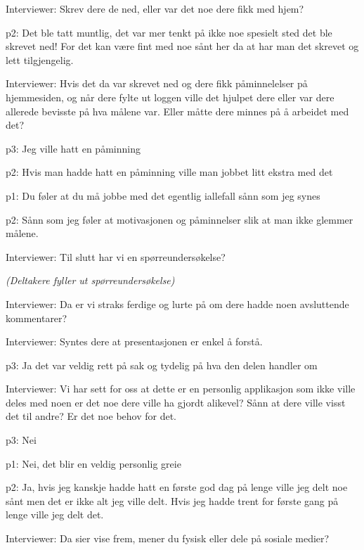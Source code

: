 \documentclass[11pt, norsk, a4paper]{article}
\begin{document}
\textcolor{myBlue} {Interviewer: }Skrev dere de ned, eller var det noe dere fikk med hjem?


\textcolor{myYellow} {p2: }Det ble tatt muntlig, det var mer tenkt på ikke noe spesielt sted det ble skrevet ned! For det kan være fint med noe sånt her da at har man det skrevet og lett tilgjengelig.


\textcolor{myBlue} {Interviewer: }Hvis det da var skrevet ned og dere fikk påminnelelser på hjemmesiden, og når dere fylte ut loggen ville det hjulpet dere eller var dere allerede bevisste på hva målene var. Eller måtte dere minnes på å arbeidet med det?


\textcolor{myR} {p3: }Jeg ville hatt en påminning


\textcolor{myYellow} {p2: }Hvis man hadde hatt en påminning ville man jobbet litt ekstra med det


\textcolor{myGreen} {p1: }Du føler at du må jobbe med det egentlig iallefall sånn som jeg synes


\textcolor{myYellow} {p2: }Sånn som jeg føler at motivasjonen og påminnelser slik at man ikke glemmer målene.


\textcolor{myBlue} {Interviewer: }Til slutt har vi en spørreundersøkelse? 


\textcolor{myGrey}{\textit{(Deltakere fyller ut spørreundersøkelse)}}


\textcolor{myBlue} {Interviewer: }Da er vi straks ferdige og lurte på om dere hadde noen avsluttende kommentarer?


\textcolor{myBlue} {Interviewer: }Syntes dere at presentasjonen er enkel å forstå. 


\textcolor{myR} {p3: }Ja det var veldig rett på sak og tydelig på hva den delen handler om


\textcolor{myBlue} {Interviewer: }Vi har sett for oss at dette er en personlig applikasjon som ikke ville deles med noen er det noe dere ville ha gjordt alikevel? Sånn at dere ville visst det til andre? Er det noe behov for det. 


\textcolor{myR} {p3: }Nei


\textcolor{myGreen} {p1: }Nei, det blir en veldig personlig greie


\textcolor{myYellow} {p2: }Ja, hvis jeg kanskje hadde hatt en første god dag på lenge ville jeg delt noe sånt men det er ikke alt jeg ville delt. Hvis jeg hadde trent for første gang på lenge ville jeg delt det.


\textcolor{myBlue} {Interviewer: }Da sier vise frem, mener du fysisk eller dele på sosiale medier?
\end{document}
